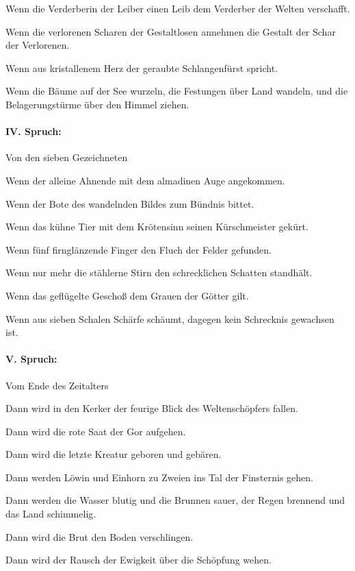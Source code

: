 Wenn die Verderberin der Leiber einen Leib dem Verderber der Welten verschafft.

Wenn die verlorenen Scharen der Gestaltlosen annehmen die Gestalt der Schar der Verlorenen.

Wenn aus kristallenem Herz der geraubte Schlangenfürst spricht.

Wenn die Bäume auf der See wurzeln, die Festungen über Land wandeln, und die Belagerungstürme über den Himmel ziehen. 

\paragraph{IV. Spruch:} Von den sieben Gezeichneten

Wenn der alleine Ahnende mit dem almadinen Auge angekommen.

Wenn der Bote des wandelnden Bildes zum Bündnis bittet.

Wenn das kühne Tier mit dem Krötensinn seinen Kürschmeister gekürt.

Wenn fünf firnglänzende Finger den Fluch der Felder gefunden.

Wenn nur mehr die stählerne Stirn den schrecklichen Schatten standhält.

Wenn das geflügelte Geschoß dem Grauen der Götter gilt.

Wenn aus sieben Schalen Schärfe schäumt, dagegen kein Schrecknis gewachsen ist. 

\paragraph{V. Spruch:} Vom Ende des Zeitalters

Dann wird in den Kerker der feurige Blick des Weltenschöpfers fallen.

Dann wird die rote Saat der Gor aufgehen.

Dann wird die letzte Kreatur geboren und gebären.

Dann werden Löwin und Einhorn zu Zweien ins Tal der Finsternis gehen.

Dann werden die Wasser blutig und die Brunnen sauer, der Regen brennend und das Land schimmelig.

Dann wird die Brut den Boden verschlingen.

Dann wird der Rausch der Ewigkeit über die Schöpfung wehen.